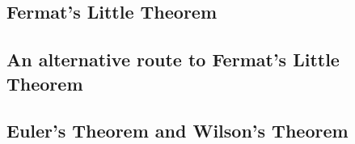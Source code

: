 \documentclass{article}
\numberwithin{equation}{thm}
\begin{document}



\subsection*{Fermat's Little Theorem}




\subsection*{An alternative route to Fermat's Little Theorem}




\subsection*{Euler's Theorem and Wilson's Theorem}


\end{document}
